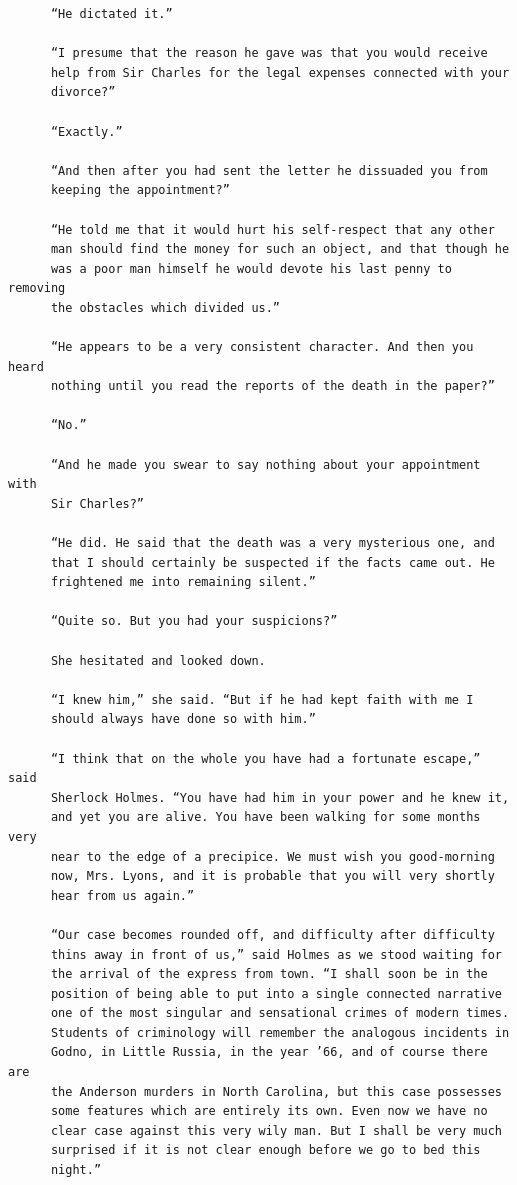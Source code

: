 \documentclass{article}
\begin{document}
\begin{verbatim}
      “He dictated it.”

      “I presume that the reason he gave was that you would receive
      help from Sir Charles for the legal expenses connected with your
      divorce?”

      “Exactly.”

      “And then after you had sent the letter he dissuaded you from
      keeping the appointment?”

      “He told me that it would hurt his self-respect that any other
      man should find the money for such an object, and that though he
      was a poor man himself he would devote his last penny to removing
      the obstacles which divided us.”

      “He appears to be a very consistent character. And then you heard
      nothing until you read the reports of the death in the paper?”

      “No.”

      “And he made you swear to say nothing about your appointment with
      Sir Charles?”

      “He did. He said that the death was a very mysterious one, and
      that I should certainly be suspected if the facts came out. He
      frightened me into remaining silent.”

      “Quite so. But you had your suspicions?”

      She hesitated and looked down.

      “I knew him,” she said. “But if he had kept faith with me I
      should always have done so with him.”

      “I think that on the whole you have had a fortunate escape,” said
      Sherlock Holmes. “You have had him in your power and he knew it,
      and yet you are alive. You have been walking for some months very
      near to the edge of a precipice. We must wish you good-morning
      now, Mrs. Lyons, and it is probable that you will very shortly
      hear from us again.”

      “Our case becomes rounded off, and difficulty after difficulty
      thins away in front of us,” said Holmes as we stood waiting for
      the arrival of the express from town. “I shall soon be in the
      position of being able to put into a single connected narrative
      one of the most singular and sensational crimes of modern times.
      Students of criminology will remember the analogous incidents in
      Godno, in Little Russia, in the year ’66, and of course there are
      the Anderson murders in North Carolina, but this case possesses
      some features which are entirely its own. Even now we have no
      clear case against this very wily man. But I shall be very much
      surprised if it is not clear enough before we go to bed this
      night.”


\end{verbatim}
\end{document}
